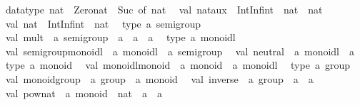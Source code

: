\begin{isabellebody}
\begin{isamarkuptext}
\ \ datatype\ nat\ {}\ Zero{}nat\ {}\ Suc\ of\ nat\isanewline
\ \ val\ nat{}aux\ {}\ IntInf{}int\ {}{}\ nat\ {}{}\ nat\isanewline
\ \ val\ nat\ {}\ IntInf{}int\ {}{}\ nat\isanewline
\ \ type\ {}a\ semigroup\isanewline
\ \ val\ mult\ {}\ {}a\ semigroup\ {}{}\ {}a\ {}{}\ {}a\ {}{}\ {}a\isanewline
\ \ type\ {}a\ monoidl\isanewline
\ \ val\ semigroup{}monoidl\ {}\ {}a\ monoidl\ {}{}\ {}a\ semigroup\isanewline
\ \ val\ neutral\ {}\ {}a\ monoidl\ {}{}\ {}a\isanewline
\ \ type\ {}a\ monoid\isanewline
\ \ val\ monoidl{}monoid\ {}\ {}a\ monoid\ {}{}\ {}a\ monoidl\isanewline
\ \ type\ {}a\ group\isanewline
\ \ val\ monoid{}group\ {}\ {}a\ group\ {}{}\ {}a\ monoid\isanewline
\ \ val\ inverse\ {}\ {}a\ group\ {}{}\ {}a\ {}{}\ {}a\isanewline
\ \ val\ pow{}nat\ {}\ {}a\ monoid\ {}{}\ nat\ {}{}\ {}a\ {}{}\ {}a\isanewline

\end{isamarkuptext}
\end{isabellebody}
